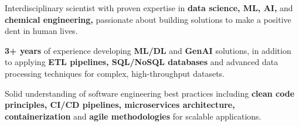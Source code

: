 

\begin{cvparagraph}
    \vspace{0.5cm}
    \begin{cvitemsfree}
        \item{Interdisciplinary scientist with proven expertise in \textbf{data science, ML, AI,} and \textbf{chemical engineering,} passionate about building solutions to make a positive dent in human lives.}

        \item{\textbf{3+ years} of experience developing \textbf{ML/DL} and \textbf{GenAI} solutions, in addition to applying \textbf{ETL pipelines, SQL/NoSQL databases} and advanced data processing techniques for complex, high-throughput datasets.}
        
        \item{Solid understanding of software engineering best practices including \textbf{clean code principles,  CI/CD pipelines, microservices architecture, containerization} and \textbf{agile methodologies} for scalable applications.}


                
    \end{cvitemsfree}


\end{cvparagraph}
